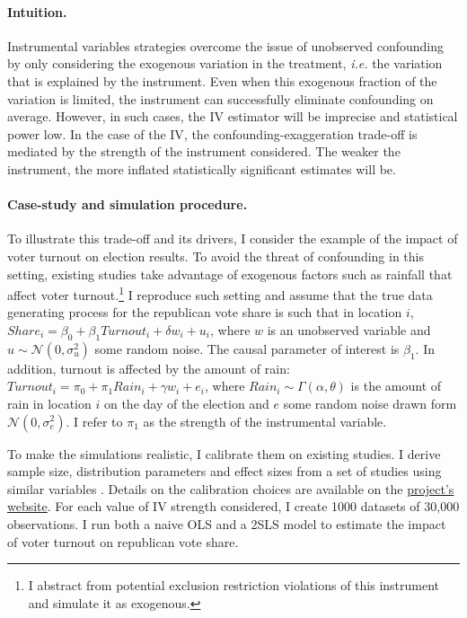 \documentclass[usletter, 12pt]{article}
\begin{document}
                		\paragraph{Intuition.} 
        			Instrumental variables strategies overcome the issue of unobserved confounding by only considering the exogenous variation in the treatment, \textit{i.e.} the variation that is explained by the instrument. Even when this exogenous fraction of the variation is limited, the instrument can successfully eliminate confounding on average. However, in such cases, the IV estimator will be imprecise and statistical power low. In the case of the IV, the confounding-exaggeration trade-off is mediated by the strength of the instrument considered. The weaker the instrument, the more inflated statistically significant estimates will be.
        		
        			\paragraph{Case-study and simulation procedure.} 
        			To illustrate this trade-off and its drivers, I consider the example of the impact of voter turnout on election results. To avoid the threat of confounding in this setting, existing studies take advantage of exogenous factors such as rainfall that affect voter turnout.\footnote{I abstract from potential exclusion restriction violations of this instrument and simulate it as exogenous.} I reproduce such setting and assume that the true data generating process for the republican vote share is such that  in location $i$, $Share_{i} = \beta_{0} + \beta_{1} Turnout_{i} + \delta w_{i} + u_{i}$, where $w$ is an unobserved variable and $u \sim \mathcal{N}(0, \sigma_{u}^{2})$ some random noise. The causal parameter of interest is $\beta_{1}$. In addition, turnout is affected by the amount of rain: $Turnout_{i} = \pi_{0} + \pi_{1} Rain_{i} + \gamma w_{i} + e_{i}$, where $Rain_{i} \sim \Gamma(\alpha, \theta)$ is the amount of rain in location $i$ on the day of the election 
			and $e$ some random noise drawn form $\mathcal{N}(0, \sigma_{e}^{2})$. I refer to $\pi_{1}$ as the strength of the instrumental variable. 
        			
        			To make the simulations realistic, I calibrate them on existing studies. I derive sample size, distribution parameters and effect sizes from a set of studies using similar variables \citep{gomez_republicans_2007, hansford_estimating_2010, fujiwara_habit_2016, cooperman_randomization_2017}. Details on the calibration choices are available on the \href{https://vincentbagilet.github.io/causal_exaggeration/IV.html#calibration-and-baseline-parameters-values}{project's website}. For each value of IV strength considered, I create 1000 datasets of 30,000 observations. I run both a naive OLS and a 2SLS model to estimate the impact of voter turnout on republican vote share. %
        		
\end{document}

